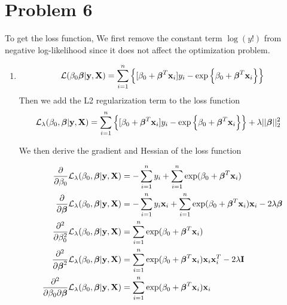 \documentclass{article}
\newcommand{\vect}[1]{\boldsymbol{#1}}
\newcommand{\vectrm}[1]{\boldsymbol{\rm #1}}
\begin{document}
\newpage
\section*{Problem 6}
To get the loss function, We first remove the constant term \(\log(y!)\) from negative log-likelihood since it does not affect the optimization problem.
\begin{enumerate}[label=(\alph*)]
  \item 
  \begin{align*}
       \mathcal L(\beta_0 \vect \beta | \vectrm y, \vectrm X) &= \sum_{i=1}^{n} \left\{ [\beta_0 + \vect{\beta}^T \vectrm{x}_i]y_i -
            \exp\left\{\beta_0 + \vect{\beta}^T \vectrm{x}_i\right\}
            \right\} \\
  \end{align*}
Then we add the L2 regularization term to the loss function
  \begin{align*}
       \mathcal L_\lambda(\beta_0, \vect \beta | \vectrm y, \vectrm X) &= \sum_{i=1}^{n} \left\{ [\beta_0 + \vect{\beta}^T \vectrm{x}_i]y_i -
            \exp\left\{\beta_0 + \vect{\beta}^T \vectrm{x}_i\right\}
            \right\} + \lambda ||\vect \beta||_2^2
  \end{align*}

  We then derive the gradient and Hessian of the loss function

  \begin{align*}
    \frac{\partial}{\partial \beta_0} \mathcal L_\lambda(\beta_0, \vect \beta | \vectrm y, \vectrm X) &= -\sum_{i=1}^{n} y_i + \sum_{i=1}^{n}\exp(\beta_0 + \vect{\beta}^T \vectrm{x}_i) \\
    \frac{\partial}{\partial \vect{\beta}} \mathcal L_\lambda(\beta_0, \vect \beta | \vectrm y, \vectrm X) &= -\sum_{i=1}^{n} y_i \vectrm{x}_i + \sum_{i=1}^{n}\exp(\beta_0 + \vect{\beta}^T \vectrm{x}_i) \vectrm{x}_i - 2\lambda\vect \beta \\
    \frac{\partial^2}{\partial \beta_0^2} \mathcal L_\lambda(\beta_0, \vect \beta | \vectrm y, \vectrm X) &= \sum_{i=1}^{n}\exp(\beta_0 + \vect{\beta}^T \vectrm{x}_i) \\
    \frac{\partial^2}{\partial \vect{\beta}^2} \mathcal L_\lambda(\beta_0, \vect \beta | \vectrm y, \vectrm X) &= \sum_{i=1}^{n}\exp(\beta_0 + \vect{\beta}^T \vectrm{x}_i) \vectrm{x}_i \vectrm{x}_i^T - 2\lambda \vectrm I \\
    \frac{\partial^2}{\partial \beta_0 \partial \vect{\beta}} \mathcal L_\lambda(\beta_0, \vect \beta | \vectrm y, \vectrm X) &= \sum_{i=1}^{n}\exp(\beta_0 + \vect{\beta}^T \vectrm{x}_i) \vectrm{x}_i \\
  \end{align*}


\end{enumerate}
\end{document}
